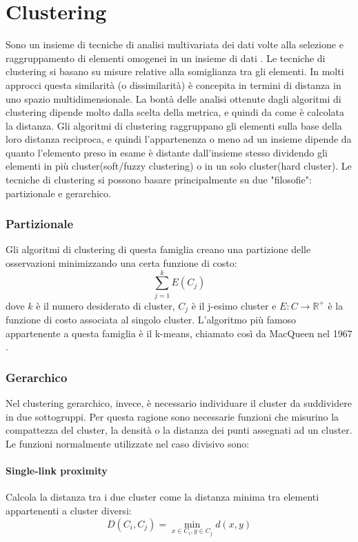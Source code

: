 \section{Clustering}
Sono un insieme di tecniche di analisi multivariata dei dati volte alla selezione e raggruppamento di elementi omogenei in un insieme di dati \cite{tryon}. Le tecniche di clustering si basano su misure relative alla somiglianza tra gli elementi. In molti approcci questa similarità (o dissimilarità) è concepita in termini di distanza in uno spazio multidimensionale. La bontà delle analisi ottenute dagli algoritmi di clustering dipende molto dalla scelta della metrica, e quindi da come è calcolata la distanza. Gli algoritmi di clustering raggruppano gli elementi sulla base della loro distanza reciproca, e quindi l'appartenenza o meno ad un insieme dipende da quanto l'elemento preso in esame è distante dall'insieme stesso dividendo gli elementi in più cluster(soft/fuzzy clustering) o in un solo cluster(hard cluster).
Le tecniche di clustering si possono basare principalmente su due "filosofie":
partizionale e gerarchico.

\subsubsection{Partizionale}
Gli algoritmi di clustering di questa famiglia creano una partizione delle osservazioni minimizzando una certa funzione di costo:
\begin{equation}
  \sum_{j=1}^{k} E\left ( C_j \right )
\end{equation}
dove $ k$ è il numero desiderato di cluster, $ C_j$ è il j-esimo cluster e $ E : C \to \mathbb{R^+}$ è la funzione di costo associata al singolo cluster. L'algoritmo più famoso appartenente a questa famiglia è il k-means, chiamato così da MacQueen nel 1967 \cite{MacQueen67}.

\subsubsection{Gerarchico}
Nel clustering gerarchico, invece, è necessario individuare il cluster da suddividere in due sottogruppi. Per questa ragione sono necessarie funzioni che misurino la compattezza del cluster, la densità o la distanza dei punti assegnati ad un cluster. Le funzioni normalmente utilizzate nel caso divisivo sono:
\paragraph{Single-link proximity}
Calcola la distanza tra i due cluster come la distanza minima tra elementi appartenenti a cluster diversi:
\begin{equation}
  D\left ( C_i, C_j \right ) = \min_{x \in C_i, y \in C_j} d\left ( x, y \right )
\end{equation}

